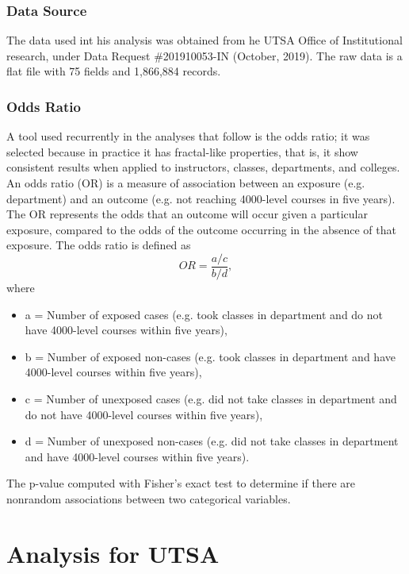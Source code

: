 \subsection{Data Source}
The data used int his analysis was obtained from he UTSA Office of Institutional research, under Data Request \#201910053-IN (October, 2019). The raw data is a flat file with 75 fields and 1,866,884 records. 

\subsection{Odds Ratio}\label{OR}
A tool used recurrently in the analyses that follow is the odds ratio; it was selected because in practice it has fractal-like properties, that is, it show consistent results when applied to instructors, classes, departments, and colleges. An odds ratio (OR) is a measure of association between an exposure (e.g. department) and an outcome (e.g. not reaching 4000-level courses in five years). The OR represents the odds that an outcome will occur given a particular exposure, compared to the odds of the outcome occurring in the absence of that exposure. The odds ratio is defined as 
\[
	OR = \frac{a/c}{b/d},
\]
where 
\begin{itemize}
	\item a = Number of exposed cases (e.g. took classes in department and do not have 4000-level courses within five years), 
	\item b = Number of exposed non-cases (e.g. took classes in department and have 4000-level courses within five years), 
	\item c = Number of unexposed cases (e.g. did not take classes in department and do not have 4000-level courses within five years), 
	\item d = Number of unexposed non-cases (e.g. did not take classes in department and have 4000-level courses within five years). 
\end{itemize}
The p-value computed with Fisher's exact test to determine if there are nonrandom associations between two categorical variables. 


\chapter{Analysis for UTSA}  \newpage
